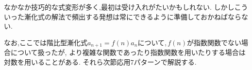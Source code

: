 なかなか技巧的な式変形が多く,最初は受け入れがたいかもしれない.
しかしこういった漸化式の解法で頻出する発想は常にできるように準備しておかねばならない.

なお,ここでは階比型漸化式$a_{n+1}=f(n)a_n$について,\,$f(n)$が指数関数でない場合について扱ったが,
より複雑な関数であったり指数関数を用いたりする場合は対数を用いることがある.
それら次節応用7パターンで解説する.
